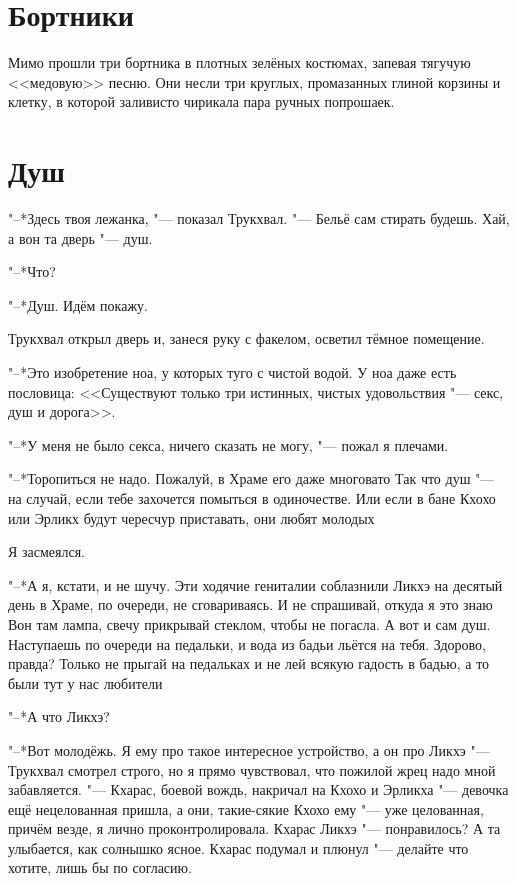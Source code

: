 \documentclass[a4paper,10pt]{book}
\newcommand{\ldotst}{\so{...}\xspace}
\begin{document}
 
 
\section{Бортники}
 
Мимо прошли три бортника в плотных зелёных костюмах, запевая тягучую 
<<медовую>> 
песню. Они несли три круглых, промазанных глиной корзины и клетку, в которой 
заливисто чирикала пара ручных попрошаек.
 
\section{Душ}
 
"--*Здесь твоя лежанка, "--- показал Трукхвал. "--- Бельё сам стирать будешь. 
Хай, а вон та дверь "--- душ.

"--*Что?

"--*Душ. Идём покажу.

Трукхвал открыл дверь и, занеся руку с факелом, осветил тёмное помещение.

"--*Это изобретение ноа, у которых туго с чистой водой. У ноа даже есть пословица: <<Существуют только три истинных, чистых удовольствия "--- секс, душ и дорога>>.

"--*У меня не было секса, ничего сказать не могу, "--- пожал я плечами.

"--*Торопиться не надо. Пожалуй, в Храме его даже многовато\ldotst 
Так что душ "--- на случай, если тебе захочется помыться в одиночестве. Или если в бане 
Кхохо или Эрликх будут чересчур приставать, они любят молодых\ldotst

Я засмеялся.

"--*А я, кстати, и не шучу. Эти ходячие гениталии соблазнили Ликхэ на десятый 
день в Храме, по очереди, не сговариваясь. И не спрашивай, откуда я это 
знаю\ldotst Вон там лампа, свечу прикрывай стеклом, чтобы не погасла. А вот и 
сам душ. Наступаешь по очереди на педальки, и вода из бадьи льётся на тебя. 
Здорово, правда? Только не прыгай на педальках и не лей всякую гадость в бадью, 
а то были тут у нас любители\ldotst

"--*А что Ликхэ?

"--*Вот молодёжь. Я ему про такое интересное устройство, а он про Ликхэ\ldotst 
"--- Трукхвал смотрел строго, но я прямо чувствовал, что пожилой жрец надо мной 
забавляется. "--- Кхарас, боевой вождь, накричал на Кхохо и Эрликха "--- 
девочка ещё нецелованная пришла, а они, такие-сякие\ldotst Кхохо ему "--- уже 
целованная, причём везде, я лично проконтролировала. Кхарас Ликхэ "--- 
понравилось? А та улыбается, как солнышко ясное. Кхарас подумал и плюнул "--- 
делайте что хотите, лишь бы по согласию.
\end{document}
